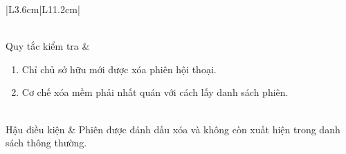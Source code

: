 \documentclass[12pt,a4paper,oneside]{report}
\begin{document}
{\begin{longtable}{|L{3.6cm}|L{11.2cm}|}
\begin{enumerate}[leftmargin=*,nosep]
                          \end{enumerate}        \\
    \hline
    Quy tắc kiểm tra    & \begin{enumerate}[leftmargin=*,nosep]
                            \item Chỉ chủ sở hữu mới được xóa phiên hội thoại.
                            \item Cơ chế xóa mềm phải nhất quán với cách lấy danh sách phiên.
                          \end{enumerate}                         \\
    \hline
    Hậu điều kiện       & Phiên được đánh dấu xóa và không còn xuất hiện trong danh sách thông thường.             \\
    \hline
  \end{longtable}
}
\end{document}
